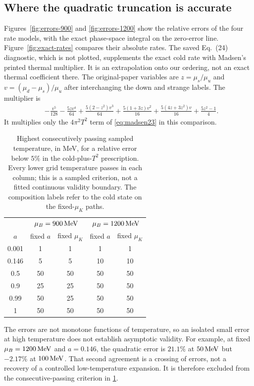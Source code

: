 \subsection{Where the quadratic truncation is accurate}
Figures~\ref{fig:errors-900} and \ref{fig:errors-1200} show the relative errors of the four rate models, with the exact phase-space integral on the zero-error line.
Figure~\ref{fig:exact-rates} compares their absolute rates.
The saved Eq.~(24) diagnostic, which is not plotted, supplements the exact cold rate with Madsen's printed thermal multiplier.
It is an extrapolation onto our ordering, not an exact thermal coefficient there.
The original-paper variables are \(z=\mu_s/\mu_u\) and \(v=(\mu_d-\mu_s)/\mu_u\) after interchanging the down and strange labels.
The multiplier is
\begin{align}
 &-\frac{v^5}{128}-\frac{5zv^4}{64}
 +\frac{5(2-z^2)v^3}{64}
 +\frac{5(1+3z)v^2}{16}
 +\frac{5(4z+3z^2)v}{16}+\frac{5z^2-1}{4}.
 \label{eq:madsen24}
\end{align}
It multiplies only the \(4\pi^2T^2\) term of \cref{eq:madsen23} in this comparison.

\begin{table}[tbp]
 \centering
 \caption{Highest consecutively passing sampled temperature, in MeV, for a relative error below \(5\%\) in the cold-plus-\(T^2\) prescription.
 Every lower grid temperature passes in each column; this is a sampled criterion, not a fitted continuous validity boundary.
 The composition labels refer to the cold state on the fixed-\(\mu_K\) paths.}
 \label{tab:five-percent}
 \begin{tabular}{ccccc}
 \toprule
 &\multicolumn{2}{c}{\(\mu_B=900\,\mathrm{MeV}\)}&\multicolumn{2}{c}{\(\mu_B=1200\,\mathrm{MeV}\)}\\
 \(a\)&fixed \(a\)&fixed \(\mu_K\)&fixed \(a\)&fixed \(\mu_K\)\\
 \midrule
 0.001&1&1&1&1\\
 0.146&5&5&10&10\\
 0.5&50&50&50&50\\
 0.9&25&25&50&50\\
 0.99&50&25&50&50\\
 1&50&50&50&50\\
 \bottomrule
 \end{tabular}
\end{table}

The errors are not monotone functions of temperature, so an isolated small error at high temperature does not establish asymptotic validity.
For example, at fixed \(\mu_B=1200\,\mathrm{MeV}\) and \(a=0.146\), the quadratic error is \(21.1\%\) at \(50\,\mathrm{MeV}\) but \(-2.17\%\) at \(100\,\mathrm{MeV}\).
That second agreement is a crossing of errors, not a recovery of a controlled low-temperature expansion.
It is therefore excluded from the consecutive-passing criterion in \cref{tab:five-percent}.


